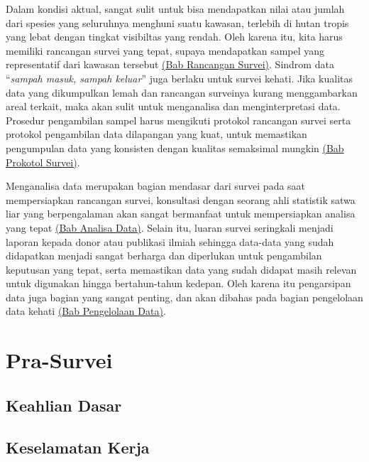 \documentclass[
  oneside]{book}
\begin{document}
Dalam kondisi aktual, sangat sulit untuk bisa mendapatkan nilai atau jumlah dari spesies yang seluruhnya menghuni suatu kawasan, terlebih di hutan tropis yang lebat dengan tingkat visibiltas yang rendah. Oleh karena itu, kita harus memiliki rancangan survei yang tepat, supaya mendapatkan sampel yang representatif dari kawasan tersebut \protect\hyperlink{rancangan-survei}{(Bab Rancangan Survei)}. Sindrom data ``\emph{sampah masuk, sampah keluar}'' juga berlaku untuk survei kehati. Jika kualitas data yang dikumpulkan lemah dan rancangan surveinya kurang menggambarkan areal terkait, maka akan sulit untuk menganalisa dan menginterpretasi data. Prosedur pengambilan sampel harus mengikuti protokol rancangan survei serta protokol pengambilan data dilapangan yang kuat, untuk memastikan pengumpulan data yang konsisten dengan kualitas semaksimal mungkin \protect\hyperlink{protokol-survei}{(Bab Prokotol Survei)}.

Menganalisa data merupakan bagian mendasar dari survei pada saat mempersiapkan rancangan survei, konsultasi dengan seorang ahli statistik satwa liar yang berpengalaman akan sangat bermanfaat untuk mempersiapkan analisa yang tepat \protect\hyperlink{analisa-data}{(Bab Analisa Data)}. Selain itu, luaran survei seringkali menjadi laporan kepada donor atau publikasi ilmiah sehingga data-data yang sudah didapatkan menjadi sangat berharga dan diperlukan untuk pengambilan keputusan yang tepat, serta memastikan data yang sudah didapat masih relevan untuk digunakan hingga bertahun-tahun kedepan. Oleh karena itu pengarsipan data juga bagian yang sangat penting, dan akan dibahas pada bagian pengelolaan data kehati \protect\hyperlink{pengelolaan-data}{(Bab Pengelolaan Data)}.

\hypertarget{pra-survei}{%
\chapter*{Pra-Survei}\label{pra-survei}}

\hypertarget{keahlian-dasar}{%
\section*{Keahlian Dasar}\label{keahlian-dasar}}

\hypertarget{keselamatan-kerja}{%
\section*{Keselamatan Kerja}\label{keselamatan-kerja}}
\end{document}
